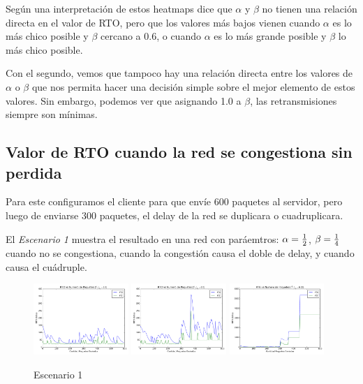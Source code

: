 	Seg\'un una interpretaci\'on de estos heatmaps dice que $\alpha$ y $\beta$
	no tienen una relaci\'on directa en el valor de RTO, pero que los valores
	m\'as bajos vienen cuando $\alpha$ es lo m\'as chico posible y $\beta$
	cercano a $0.6$, o cuando $\alpha$ es lo m\'as grande posible y $\beta$ lo
	m\'as chico posible.

	Con el segundo, vemos que tampoco hay una relaci\'on directa entre los
	valores de $\alpha$ o $\beta$ que nos permita hacer una decisi\'on simple
	sobre el mejor elemento de estos valores. Sin embargo, podemos ver que
	asignando 1.0 a $\beta$, las retransmisiones siempre son m\'inimas.

	\newpage
    \subsection{Valor de RTO cuando la red se congestiona sin perdida}
        Para este configuramos el cliente para que env\'ie 600 paquetes al
        servidor, pero luego de enviarse 300 paquetes, el delay de la red
        se duplicara o cuadruplicara.

        El \emph{Escenario 1} muestra el resultado en una red con
        par\'aemtros: $\alpha={{1}\over{2}}$, $\beta={{1}\over{4}}$
        cuando no se congestiona, cuando la congesti\'on causa el doble de
        delay, y cuando causa el cu\'adruple.

        \begin{figure}[H]
            \center

		    \includegraphics[width=0.32\textwidth]{imagenes/congestion_1.pdf}
		    \includegraphics[width=0.32\textwidth]{imagenes/congestion_2.pdf}
		    \includegraphics[width=0.32\textwidth]{imagenes/congestion_4.pdf}

            \caption*{Escenario 1}

        \end{figure}

